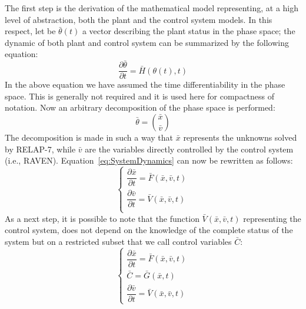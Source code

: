 \documentclass{mc2013}
\begin{document}
\label{sec:PlantControlModel}
The first step is the derivation of the mathematical model representing, at a high level of abstraction, both 
the plant and the control system models. In this respect, let be $\bar{\theta}(t)$ a vector describing the plant status in the phase space; the dynamic of both plant and control system can be summarized by the following equation:
\begin{equation}
\frac{\partial \bar{\theta}}{\partial t} = \bar{H}(\theta(t),t)
\label{eq:SystemDynamics}
\end{equation}
In the above equation we have assumed the time differentiability in the phase space. This is generally
not required and it is used here for compactness of notation. Now an arbitrary decomposition of the
phase space is performed:
\begin{equation}
\bar{\theta}=\binom{\bar{x}}{\bar{v}}
\label{eq:firstDecomposition}
\end{equation}
The decomposition is made in such a way that $\bar{x}$ represents the unknowns solved by RELAP-7, while $\bar{v}$ are the variables directly controlled by the control system (i.e., RAVEN). Equation~\ref{eq:SystemDynamics} can now be rewritten as follows:
\begin{equation}
\begin{cases} 
\dfrac{\partial \bar{x}}{\partial t} = \bar{F}(\bar{x},\bar{v},t) \\ 
\dfrac{\partial \bar{v}}{\partial t} = \bar{V}(\bar{x},\bar{v},t) \\
\end{cases}
\label{eq:generalSystemEquation}
\end{equation}
As a next step, it is possible to note that the function 
$\bar{V}(\bar{x},\bar{v},t)$ 
representing the control system, does not depend on the knowledge of the complete status of the system but on a restricted subset that we call control variables $\bar{C}$:
\begin{equation}
\begin{cases} 
\dfrac{\partial \bar{x}}{\partial t} = \bar{F}(\bar{x},\bar{v},t) \\
\bar{C} = \bar{G}(\bar{x},t) \\ 
\dfrac{\partial \bar{v}}{\partial t} = \bar{V}(\bar{x},\bar{v},t) 
\end{cases}
\label{eq:generalSystemEquationwithControl}
\end{equation}

\end{document}
